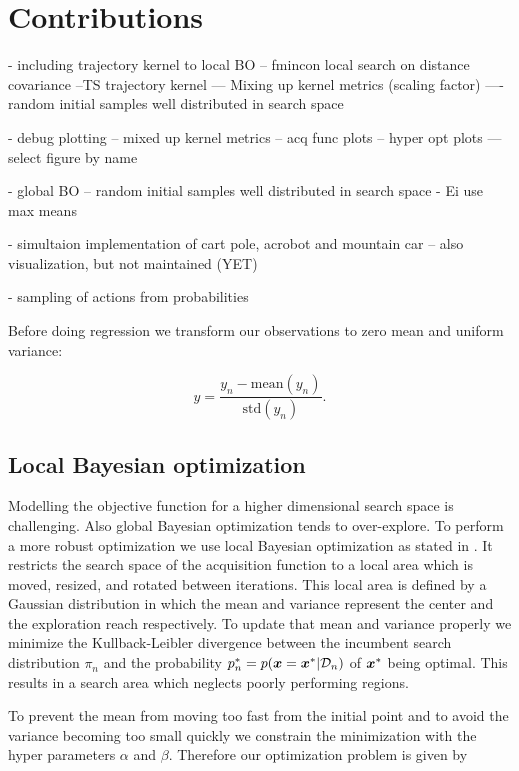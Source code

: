 \chapter{Contributions}
\label{chap:contributions}

- including trajectory kernel to local BO
-- fmincon local search on distance covariance
--TS trajectory kernel
--- Mixing up kernel metrics (scaling factor)
---- random initial samples well distributed in search space

- debug plotting
-- mixed up kernel metrics
-- acq func plots
-- hyper opt plots
--- select figure by name

- global BO
-- random initial samples well distributed in search space
- Ei use max means

- simultaion implementation of cart pole, acrobot and mountain car
-- also visualization, but not maintained (YET)

- sampling of actions from probabilities

Before doing regression we transform our observations to zero mean and uniform variance:

$$y = \frac{y_{n}-\mathrm{mean}(y_{n})}{\mathrm{std}(y_{n})}.$$


\section{Local Bayesian optimization}

Modelling the objective function for a higher dimensional search space is challenging. Also global Bayesian optimization tends to over-explore. To perform a more robust optimization we use local Bayesian optimization as stated in \cite{akrour2017local}. It restricts the search space of the acquisition function to a local area which is moved, resized, and rotated between iterations. This local area is defined by a Gaussian distribution in which the mean and variance represent the center and the exploration reach respectively. To update that mean and variance properly we minimize the Kullback-Leibler divergence between the incumbent search distribution $\pi_n$ and the probability $p_n^* = p({\boldsymbol{x}}={\boldsymbol{x}}^*|\mathcal{D}_n)$ of ${\boldsymbol{x}}^*$ being optimal. This results in a search area which neglects poorly performing regions.

To prevent the mean from moving too fast from the initial point and to avoid the variance becoming too small quickly we constrain the minimization with the hyper parameters $\alpha$ and $\beta$. Therefore our optimization problem is given by


